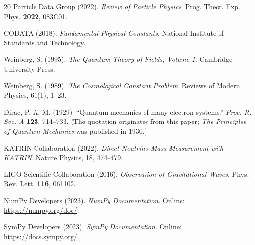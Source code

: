 \begin{thebibliography}{20}
Particle Data Group (2022). 
\textit{Review of Particle Physics}. 
Prog. Theor. Exp. Phys. \textbf{2022}, 083C01.

CODATA (2018). 
\textit{Fundamental Physical Constants}. 
National Institute of Standards and Technology.

Weinberg, S. (1995). 
\textit{The Quantum Theory of Fields, Volume 1}. 
Cambridge University Press.

Weinberg, S. (1989). 
\textit{The Cosmological Constant Problem}. 
Reviews of Modern Physics, 61(1), 1--23.

Dirac, P. A. M. (1929).
``Quantum mechanics of many-electron systems.''
\textit{Proc. R. Soc. A} \textbf{123}, 714--733.
(The quotation originates from this paper; \textit{The Principles of Quantum Mechanics} was published in 1930.)

KATRIN Collaboration (2022). 
\textit{Direct Neutrino Mass Measurement with KATRIN}. 
Nature Physics, 18, 474--479.

LIGO Scientific Collaboration (2016). 
\textit{Observation of Gravitational Waves}. 
Phys. Rev. Lett. \textbf{116}, 061102.

NumPy Developers (2023). 
\textit{NumPy Documentation}. 
Online: \url{https://numpy.org/doc/}.

SymPy Developers (2023). 
\textit{SymPy Documentation}. 
Online: \url{https://docs.sympy.org/}.

\end{thebibliography}
